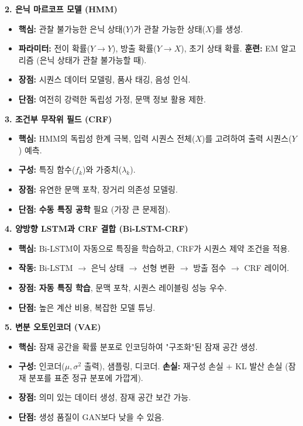 \documentclass[11pt,a4paper]{article}
\theoremstyle{definition}
\begin{document}
\begin{tcolorbox}[summarybox, title=핵심 개념 요약]
\textbf{2. 은닉 마르코프 모델 (HMM)}
\begin{itemize}
    \item \textbf{핵심:} 관찰 불가능한 은닉 상태($Y$)가 관찰 가능한 상태($X$)를 생성.
    \item \textbf{파라미터:} 전이 확률($Y \to Y$), 방출 확률($Y \to X$), 초기 상태 확률.
    \textbf{훈련:} EM 알고리즘 (은닉 상태가 관찰 불가능할 때).
    \item \textbf{장점:} 시퀀스 데이터 모델링, 품사 태깅, 음성 인식.
    \item \textbf{단점:} 여전히 강력한 독립성 가정, 문맥 정보 활용 제한.
\end{itemize}
\end{tcolorbox}

\begin{tcolorbox}[summarybox, title=핵심 개념 요약]
\textbf{3. 조건부 무작위 필드 (CRF)}
\begin{itemize}
    \item \textbf{핵심:} HMM의 독립성 한계 극복, 입력 시퀀스 전체($X$)를 고려하여 출력 시퀀스($Y$) 예측.
    \item \textbf{구성:} 특징 함수($f_k$)와 가중치($\lambda_k$).
    \item \textbf{장점:} 유연한 문맥 포착, 장거리 의존성 모델링.
    \item \textbf{단점:} \textbf{수동 특징 공학} 필요 (가장 큰 문제점).
\end{itemize}
\end{tcolorbox}

\begin{tcolorbox}[summarybox, title=핵심 개념 요약]
\textbf{4. 양방향 LSTM과 CRF 결합 (Bi-LSTM-CRF)}
\begin{itemize}
    \item \textbf{핵심:} Bi-LSTM이 자동으로 특징을 학습하고, CRF가 시퀀스 제약 조건을 적용.
    \item \textbf{작동:} Bi-LSTM $\to$ 은닉 상태 $\to$ 선형 변환 $\to$ 방출 점수 $\to$ CRF 레이어.
    \item \textbf{장점:} \textbf{자동 특징 학습}, 문맥 포착, 시퀀스 레이블링 성능 우수.
    \item \textbf{단점:} 높은 계산 비용, 복잡한 모델 튜닝.
\end{itemize}
\end{tcolorbox}

\begin{tcolorbox}[summarybox, title=핵심 개념 요약]
\textbf{5. 변분 오토인코더 (VAE)}
\begin{itemize}
    \item \textbf{핵심:} 잠재 공간을 확률 분포로 인코딩하여 "구조화"된 잠재 공간 생성.
    \item \textbf{구성:} 인코더($\mu, \sigma^2$ 출력), 샘플링, 디코더.
    \textbf{손실:} 재구성 손실 + KL 발산 손실 (잠재 분포를 표준 정규 분포에 가깝게).
    \item \textbf{장점:} 의미 있는 데이터 생성, 잠재 공간 보간 가능.
    \item \textbf{단점:} 생성 품질이 GAN보다 낮을 수 있음.
\end{itemize}
\end{tcolorbox}
\end{document}
